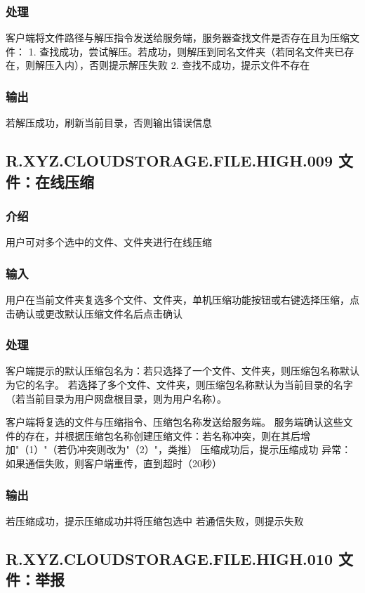 \subsubsection{处理} 
客户端将文件路径与解压指令发送给服务端，服务器查找文件是否存在且为压缩文件：
1. 查找成功，尝试解压。若成功，则解压到同名文件夹（若同名文件夹已存在，则解压入内），否则提示解压失败
2. 查找不成功，提示文件不存在


\subsubsection{输出} 
若解压成功，刷新当前目录，否则输出错误信息

\subsection{R.XYZ.CLOUDSTORAGE.FILE.HIGH.009 文件：在线压缩}

\subsubsection{介绍}
用户可对多个选中的文件、文件夹进行在线压缩
 
\subsubsection{输入} 
用户在当前文件夹复选多个文件、文件夹，单机压缩功能按钮或右键选择压缩，点击确认或更改默认压缩文件名后点击确认

\subsubsection{处理} 
客户端提示的默认压缩包名为：若只选择了一个文件、文件夹，则压缩包名称默认为它的名字。
若选择了多个文件、文件夹，则压缩包名称默认为当前目录的名字（若当前目录为用户网盘根目录，则为用户名称）。

客户端将复选的文件与压缩指令、压缩包名称发送给服务端。
服务端确认这些文件的存在，并根据压缩包名称创建压缩文件：若名称冲突，则在其后增加"（1）"（若仍冲突则改为"（2）"，类推）
压缩成功后，提示压缩成功
异常：如果通信失败，则客户端重传，直到超时（20秒）

\subsubsection{输出} 
若压缩成功，提示压缩成功并将压缩包选中
若通信失败，则提示失败


\subsection{R.XYZ.CLOUDSTORAGE.FILE.HIGH.010 文件：举报}

